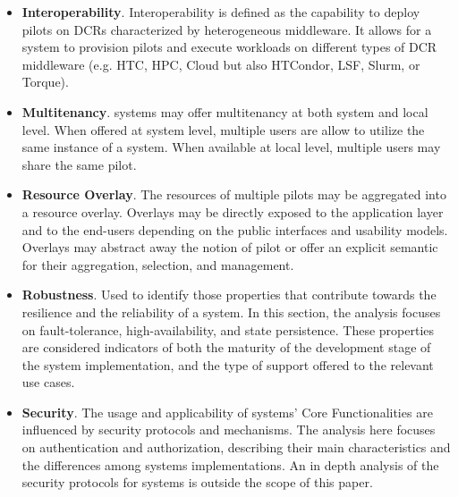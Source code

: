 \documentclass{sig-alternate}
\begin{document}
\begin{itemize}
\item \textbf{Interoperability}. Interoperability is defined as the capability
  to deploy pilots on DCRs characterized by heterogeneous middleware. It allows
  for a \pilot system to provision pilots and execute workloads on different
  types of DCR middleware (e.g. HTC, HPC, Cloud but also HTCondor, LSF, Slurm, or
  Torque).

\item \textbf{Multitenancy}. \pilot systems may offer multitenancy at both
  system and local level. When offered at system level, multiple users are allow
  to utilize the same instance of a \pilot system. When available at local
  level, multiple users may share the same pilot.

\item \textbf{Resource Overlay}. The resources of multiple pilots may be
  aggregated into a resource overlay. Overlays may be directly exposed to the
  application layer and to the end-users depending on the public interfaces and
  usability models. Overlays may abstract away the notion of pilot or offer an
  explicit semantic for their aggregation, selection, and management.

\item \textbf{Robustness}. Used to identify those properties that contribute
  towards the resilience and the reliability of a \pilot system. In this
  section, the analysis focuses on fault-tolerance, high-availability, and state
  persistence. These properties are considered indicators of both the maturity
  of the development stage of the \pilot system implementation, and the type of
  support offered to the relevant use cases.


\item \textbf{Security}. The usage and applicability of \pilot systems' Core
Functionalities are influenced by security protocols and mechanisms. The
analysis here focuses on authentication and authorization, describing their main
characteristics and the differences among \pilot systems implementations. An in
depth analysis of the security protocols for \pilot systems is outside the scope
of this paper.


\end{itemize}
\end{document}

